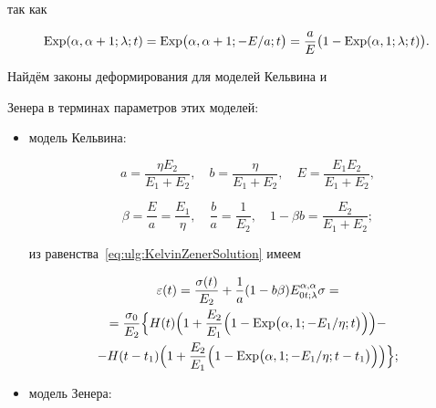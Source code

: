 так как 

$$\displaystyle   \mathop{\rm Exp}\nolimits  (\alpha,\alpha+1;\lambda;t)=  \mathop{\rm Exp}\nolimits  \bigl(\alpha,\alpha+1;-{E}/{a};t\bigr)=\frac{a}{E}\bigl(1-  \mathop{\rm Exp}\nolimits  (\alpha,1;\lambda;t)\bigr).$$



Найдём законы деформирования для моделей Кельвина и

Зенера в терминах параметров этих моделей:



\begin{itemize}

\item модель Кельвина: 

$$

a= \frac{\eta E_{2}}{E_{1}+E_{2}}, \quad 

b= \frac{\eta}{E_{1}+E_{2}},\quad 

E= \frac{E_{1}E_{2}} {E_{1}+E_{2}},$$

$$

\beta=\frac E a= \frac{E_{1}}\eta,\quad 

\frac b a= \frac 1 {E_{2}},\quad  

1-\beta b= \frac{E_{2}}{E_{1}+E_{2}};$$

из равенства~\eqref{eq:ulg:KelvinZenerSolution} имеем

\begin{multline}\label{eq:ulg:FracKelvinSolution}

\varepsilon(t)=

\frac{\sigma(t)}{E_{2}}+\frac{1}{a}(1-b\beta)E_{0t;\lambda}^{\alpha,\alpha}\sigma= \\ 

=\frac{\sigma_{0}}{E_{2}}

\Bigl\{

H(t)\Bigl(1+\frac{E_{2}}{E_{1}}\Bigl(1-  \mathop{\rm Exp}\nolimits  \bigl(\alpha, 1;-{E_{1}}/{\eta};t\bigr)

\Bigr)

\Bigr)-\\

-H(t-t_{1})\Bigl(1+\frac{E_{2}}{E_{1}}\Bigr(1-  \mathop{\rm Exp}\nolimits  \bigl(\alpha, 1;-{E_{1}}/{\eta};t-t_{1}\bigr)\Bigr)\Bigr)

\Bigr\};

\end{multline}



\item модель Зенера:


\end{itemize}

